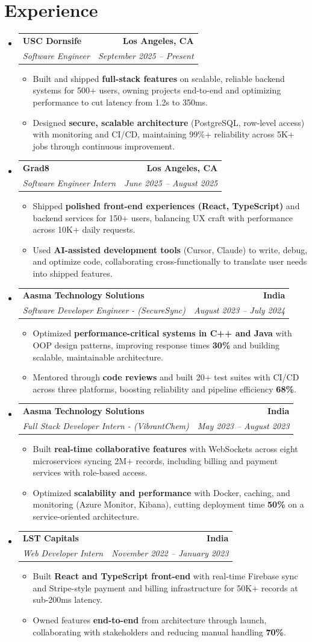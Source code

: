 \documentclass[letterpaper,10pt]{article}
\makeatletter
\newcommand{\resumeItem}[1]{\item\small{{#1 \vspace{-2pt}}}}
\newcommand{\resumeSubheading}[4]{\vspace{-1pt}\item\begin{tabular*}{1.0\textwidth}[t]{l@{\extracolsep{\fill}}r}\textbf{#1} & \textbf{\small #2} \\\textit{\small#3} & \textit{\small #4} \\\end{tabular*}\vspace{-2pt}}
\newcommand{\resumeSubHeadingListStart}{\begin{itemize}[leftmargin=0.0in, label={}]}
\newcommand{\resumeSubHeadingListEnd}{\end{itemize}}
\newcommand{\resumeItemListStart}{\begin{itemize}[leftmargin=0.15in,label=\textbullet,itemsep=2pt,topsep=0pt,parsep=0pt,partopsep=0pt]}
\newcommand{\resumeItemListEnd}{\end{itemize}\vspace{-4pt}}
\makeatother
\begin{document}
\section{Experience}
\resumeSubHeadingListStart
\resumeSubheading{USC Dornsife}{Los Angeles, CA}{Software Engineer}{September 2025 -- Present}
\resumeItemListStart
\resumeItem{Built and shipped \textbf{full-stack features} on scalable, reliable backend systems for 500+ users, owning projects end-to-end and optimizing performance to cut latency from 1.2s to 350ms.}
\resumeItem{Designed \textbf{secure, scalable architecture} (PostgreSQL, row-level access) with monitoring and CI/CD, maintaining 99\%+ reliability across 5K+ jobs through continuous improvement.}
\resumeItemListEnd
\resumeSubheading{Grad8}{Los Angeles, CA}{Software Engineer Intern}{June 2025 -- August 2025}
\resumeItemListStart
\resumeItem{Shipped \textbf{polished front-end experiences (React, TypeScript)} and backend services for 150+ users, balancing UX craft with performance across 10K+ daily requests.}
\resumeItem{Used \textbf{AI-assisted development tools} (Cursor, Claude) to write, debug, and optimize code, collaborating cross-functionally to translate user needs into shipped features.}
\resumeItemListEnd
\resumeSubheading{Aasma Technology Solutions}{India}{Software Developer Engineer - (SecureSync)}{August 2023 -- July 2024}
\resumeItemListStart
\resumeItem{Optimized \textbf{performance-critical systems in C++ and Java} with OOP design patterns, improving response times \textbf{30\%} and building scalable, maintainable architecture.}
\resumeItem{Mentored through \textbf{code reviews} and built 20+ test suites with CI/CD across three platforms, boosting reliability and pipeline efficiency \textbf{68\%}.}
\resumeItemListEnd
\resumeSubheading{Aasma Technology Solutions}{India}{Full Stack Developer Intern - (VibrantChem)}{May 2023 -- August 2023}
\resumeItemListStart
\resumeItem{Built \textbf{real-time collaborative features} with WebSockets across eight microservices syncing 2M+ records, including billing and payment services with role-based access.}
\resumeItem{Optimized \textbf{scalability and performance} with Docker, caching, and monitoring (Azure Monitor, Kibana), cutting deployment time \textbf{50\%} on a service-oriented architecture.}
\resumeItemListEnd
\resumeSubheading{LST Capitals}{India}{Web Developer Intern}{November 2022 -- January 2023}
\resumeItemListStart
\resumeItem{Built \textbf{React and TypeScript front-end} with real-time Firebase sync and Stripe-style payment and billing infrastructure for 50K+ records at sub-200ms latency.}
\resumeItem{Owned features \textbf{end-to-end} from architecture through launch, collaborating with stakeholders and reducing manual handling \textbf{70\%}.}
\resumeItemListEnd
\resumeSubHeadingListEnd
\vspace{-6pt}
\end{document}
